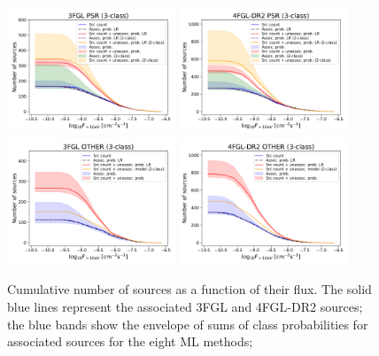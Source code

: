 \documentclass[referee]{aa} %
\begin{document}
\begin{figure}[h]
\centering
\includegraphics[width=0.45\textwidth]{plots/N_logS_3FGL_PSR_3classes.pdf}
\includegraphics[width=0.45\textwidth]{plots/N_logS_4FGL-DR2_PSR_3classes.pdf} \\
\includegraphics[width=0.45\textwidth]{plots/N_logS_3FGL_OTHER_3classes.pdf}
\includegraphics[width=0.45\textwidth]{plots/N_logS_4FGL-DR2_OTHER_3classes.pdf}
\caption{Cumulative number of sources as a function of their flux. 
The solid blue lines represent the associated 3FGL and 4FGL-DR2  sources; the blue bands show the envelope of sums of class probabilities for associated sources for the eight ML methods;  
}
\end{figure}
\end{document}

